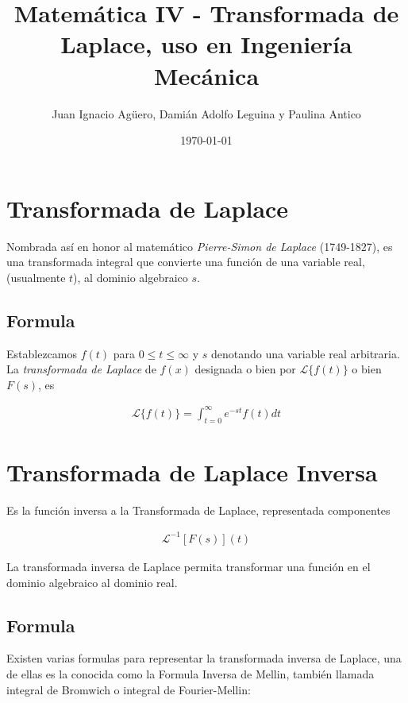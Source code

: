 \documentclass{article}
\title{Matemática IV - Transformada de Laplace, uso en Ingeniería Mecánica}
\author{
    Juan Ignacio Agüero, Damián Adolfo Leguina y Paulina Antico
}
\date{\today}
\begin{document}
\maketitle

\tableofcontents

\newpage

\section{Transformada de Laplace}

Nombrada así en honor al matemático \emph{Pierre-Simon de Laplace} (1749-1827), es una transformada integral que convierte una función de una variable real, (usualmente \(t\)), al dominio algebraico \(s\).

\subsection*{Formula}

Establezcamos \(f(t)\) para \(0 \leq t \le \infty\) y \(s\) denotando una variable real arbitraria. La \emph{transformada de Laplace} de \(f(x)\) designada o bien por \(\mathcal{L}\{f(t)\}\) o bien \(F(s)\), es

\begin{align*}
    \mathcal{L}\{f(t)\}=\int_{t=0}^{\infty}e^{-st}f(t)dt
\end{align*}

\newpage

\section{Transformada de Laplace Inversa}

Es la función inversa a la Transformada de Laplace, representada componentes

\begin{align*}
    \mathcal{L}^{-1}\left[F\left(s\right)\right](t)
\end{align*}

La transformada inversa de Laplace permita transformar una función en el dominio algebraico al dominio real.

\subsection*{Formula}

Existen varias formulas para representar la transformada inversa de Laplace, una de ellas es la conocida como la Formula Inversa de Mellin, también llamada integral de Bromwich o integral de Fourier-Mellin:
\end{document}
